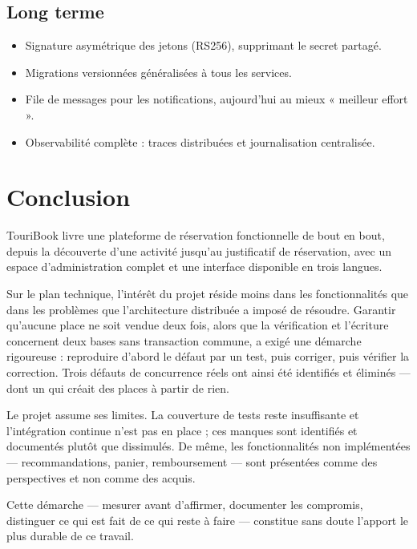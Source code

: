 \documentclass[11pt,a4paper]{report}
\begin{document}
\section{Long terme}

\begin{itemize}
  \item Signature asymétrique des jetons (RS256), supprimant le secret partagé.
  \item Migrations versionnées généralisées à tous les services.
  \item File de messages pour les notifications, aujourd'hui au mieux
    « meilleur effort ».
  \item Observabilité complète : traces distribuées et journalisation
    centralisée.
\end{itemize}

\chapter{Conclusion}

TouriBook livre une plateforme de réservation fonctionnelle de bout en bout,
depuis la découverte d'une activité jusqu'au justificatif de réservation, avec
un espace d'administration complet et une interface disponible en trois langues.

Sur le plan technique, l'intérêt du projet réside moins dans les fonctionnalités
que dans les problèmes que l'architecture distribuée a imposé de résoudre.
Garantir qu'aucune place ne soit vendue deux fois, alors que la vérification et
l'écriture concernent deux bases sans transaction commune, a exigé une démarche
rigoureuse : reproduire d'abord le défaut par un test, puis corriger, puis
vérifier la correction. Trois défauts de concurrence réels ont ainsi été
identifiés et éliminés — dont un qui créait des places à partir de rien.

Le projet assume ses limites. La couverture de tests reste insuffisante et
l'intégration continue n'est pas en place ; ces manques sont identifiés et
documentés plutôt que dissimulés. De même, les fonctionnalités non implémentées
— recommandations, panier, remboursement — sont présentées comme des
perspectives et non comme des acquis.

Cette démarche — mesurer avant d'affirmer, documenter les compromis, distinguer
ce qui est fait de ce qui reste à faire — constitue sans doute l'apport le plus
durable de ce travail.
\end{document}
